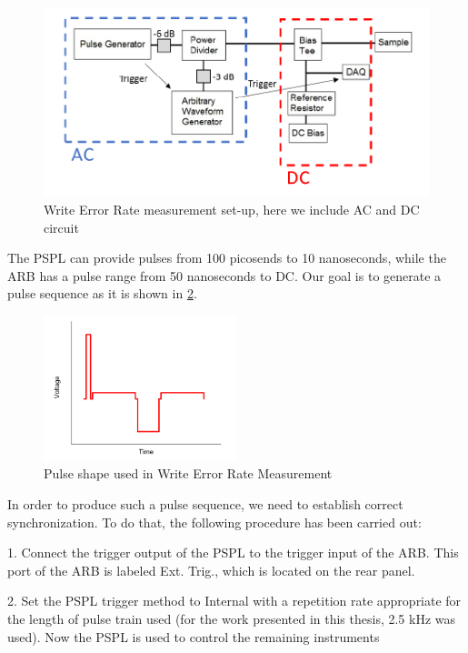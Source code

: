 \begin{figure}[h!]
    \centering
    \includegraphics[width=1.0\textwidth]{fig/WER_setup.PNG}
    \caption{Write Error Rate measurement set-up, here we include AC and DC circuit}
    \label{fig:WER}

\end{figure}

The PSPL can provide pulses from 100 picosends to 10 nanoseconds, while the ARB has a pulse range from 50 nanoseconds to DC. Our goal is to generate a pulse sequence as it is shown in \ref{fig:Pulse}.

\begin{figure}[h!]
    \centering
    \includegraphics[width=0.5\textwidth]{fig/pulse.PNG}
    \caption{Pulse shape used in Write Error Rate Measurement}
    \label{fig:Pulse}
\end{figure}




In order to produce such a pulse sequence, we need to establish correct synchronization. To do that, the following procedure has been carried out:

1. Connect the trigger output of the PSPL to the trigger input of the ARB. This port of the ARB is labeled Ext. Trig., which is located
on the rear panel.

2. Set the PSPL trigger method to Internal with a repetition rate appropriate for the
length of pulse train used (for the work presented in this thesis, 2.5 kHz was used). Now the PSPL is used to control the remaining instruments

